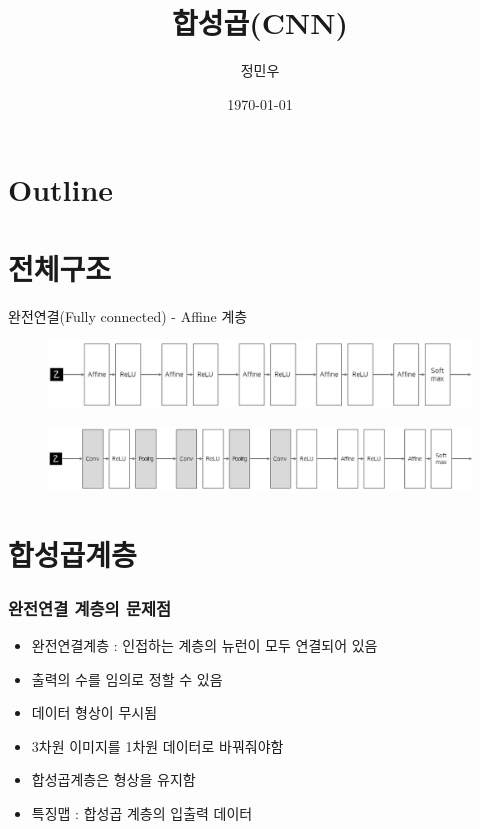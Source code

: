 \documentclass{beamer}
\begin{document}
\begin{frame}
	\title{합성곱(CNN)}
	\author{정민우}
	\date{\today}
	\titlepage
\end{frame}



\section*{Outline}
\begin{frame}
\tableofcontents
\end{frame}



\section{전체구조}
\begin{frame}
	완전연결(Fully connected) - Affine 계층
	\begin{figure}
		\includegraphics[width=1\columnwidth]{../Figure/Figure_1.pdf}
	\end{figure}
	\begin{figure}
		\includegraphics[width=1\columnwidth]{../Figure/Figure_2.pdf}
	\end{figure}	
\end{frame}

\section{합성곱계층}

\begin{frame}
	\frametitle{완전연결 계층의 문제점}
	\begin{itemize}
		\item 완전연결계층 : 인접하는 계층의 뉴런이 모두 연결되어 있음
		\item 출력의 수를 임의로 정할 수 있음
		\item 데이터 형상이 무시됨
		\item 3차원 이미지를 1차원 데이터로 바꿔줘야함
		\item 합성곱계층은 형상을 유지함
		\item 특징맵 : 합성곱 계층의 입출력 데이터
	\end{itemize}
\end{frame}
\end{document}
